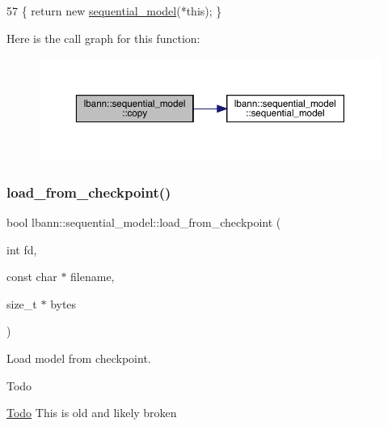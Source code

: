 \begin{DoxyCode}
57 \{ \textcolor{keywordflow}{return} \textcolor{keyword}{new} \hyperlink{classlbann_1_1sequential__model_a269f246d881186f8e8608dc4758cc6a6}{sequential\_model}(*\textcolor{keyword}{this}); \}
\end{DoxyCode}
Here is the call graph for this function\+:\nopagebreak
\begin{figure}[H]
\begin{center}
\leavevmode
\includegraphics[width=350pt]{classlbann_1_1sequential__model_a548d44a9c4c6bec3680d60b20ac9bd73_cgraph}
\end{center}
\end{figure}
\mbox{\label{classlbann_1_1sequential__model_aa405c653dae867e862475e13b9df1db0}} 
\subsubsection{\texorpdfstring{load\+\_\+from\+\_\+checkpoint()}{load\_from\_checkpoint()}}
{\footnotesize\ttfamily bool lbann\+::sequential\+\_\+model\+::load\+\_\+from\+\_\+checkpoint (\begin{DoxyParamCaption}\item[{int}]{fd,  }\item[{const char $\ast$}]{filename,  }\item[{size\+\_\+t $\ast$}]{bytes }\end{DoxyParamCaption})}



Load model from checkpoint. 

\begin{DoxyRefDesc}{Todo}
\item[\hyperlink{todo__todo000027}{Todo}]This is old and likely broken \end{DoxyRefDesc}



